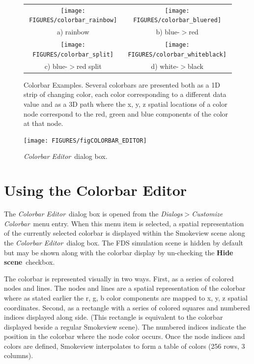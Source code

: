 \documentclass[11pt,twoside]{book}
\begin{document}
\begin{figure}[\figoptions]
\begin{center}
\begin{tabular}{cc}
\texttt{[image: FIGURES/colorbar\_rainbow]}&
\texttt{[image: FIGURES/colorbar\_bluered]}\\
a) rainbow&b) blue-$>$red\\
\texttt{[image: FIGURES/colorbar\_split]}&
\texttt{[image: FIGURES/colorbar\_whiteblack]}\\
c) blue-$>$red split&d) white-$>$black
\end{tabular}
\end{center}
\caption[Colorbar Examples]{
Colorbar Examples.  Several colorbars are presented both as a 1D strip
of changing color, each color corresponding to a different data value and as a 3D path where the x, y, z spatial locations
of a color node correspond to the red, green and blue components of the color at that node.} \label{figCOLORBAR_EXAMPLES}
\end{figure}

\begin{figure}[\figoptions]
\begin{center}
\texttt{[image: FIGURES/figCOLORBAR\_EDITOR]}
\end{center}
\caption[{\em Colorbar Editor}\ dialog box.]{ {\em Colorbar
Editor}\ dialog box.} \label{figCOLORBAR}
\end{figure}

\section{Using the Colorbar Editor}
The {\em Colorbar Editor}\ dialog box is opened from the {\em
Dialogs$>$Customize Colorbar}\ menu entry. When this menu item is
selected, a spatial representation of the currently selected
colorbar is displayed within the Smokeview scene along the {\em
Colorbar Editor}\ dialog box.  The FDS simulation scene is hidden
by default but may be shown along with the colorbar display by
un-checking the {\bf Hide scene}\ checkbox.

The colorbar is represented visually in two ways.  First, as a series
of colored nodes and lines.
The nodes and lines are a spatial representation of the colorbar where as
stated earlier the r, g, b color components are mapped to x, y, z spatial
coordinates.
Second, as a rectangle with a series of colored squares and numbered
indices
displayed along side. (This rectangle is equivalent to the colorbar
displayed beside a regular Smokeview scene).  The numbered indices indicate
the position in the colorbar where the node color occurs.
Once the node indices and colors are defined, Smokeview interpolates to
form a table of colors (256 rows, 3 columns).
\end{document}

